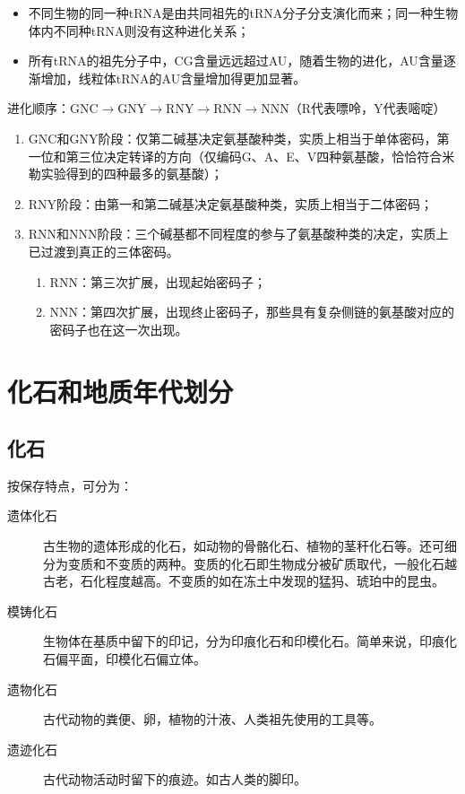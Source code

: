 \begin{itemize}
	\item 不同生物的同一种tRNA是由共同祖先的tRNA分子分支演化而来；同一种生物体内不同种tRNA则没有这种进化关系；
	\item 所有tRNA的祖先分子中，CG含量远远超过AU，随着生物的进化，AU含量逐渐增加，线粒体tRNA的AU含量增加得更加显著。
\end{itemize}

进化顺序：GNC$\longrightarrow$GNY$\longrightarrow$RNY$\longrightarrow$RNN$\longrightarrow$NNN（R代表嘌呤，Y代表嘧啶）

\begin{enumerate}
	\item GNC和GNY阶段：仅第二碱基决定氨基酸种类，实质上相当于单体密码，第一位和第三位决定转译的方向（仅编码G、A、E、V四种氨基酸，恰恰符合米勒实验得到的四种最多的氨基酸）；
	\item RNY阶段：由第一和第二碱基决定氨基酸种类，实质上相当于二体密码；
	\item RNN和NNN阶段：三个碱基都不同程度的参与了氨基酸种类的决定，实质上已过渡到真正的三体密码。
	\begin{enumerate}
		\item RNN：第三次扩展，出现起始密码子；
		\item NNN：第四次扩展，出现终止密码子，那些具有复杂侧链的氨基酸对应的密码子也在这一次出现。
	\end{enumerate}
\end{enumerate}

\section{化石和地质年代划分}

\subsection{化石}

按保存特点，可分为：

\begin{description}
	\item[遗体化石] 古生物的遗体形成的化石，如动物的骨骼化石、植物的茎秆化石等。还可细分为变质和不变质的两种。变质的化石即生物成分被矿质取代，一般化石越古老，石化程度越高。不变质的如在冻土中发现的猛犸、琥珀中的昆虫。
	\item[模铸化石] 生物体在基质中留下的印记，分为印痕化石和印模化石。简单来说，印痕化石偏平面，印模化石偏立体。
	\item[遗物化石] 古代动物的粪便、卵，植物的汁液、人类祖先使用的工具等。
	\item[遗迹化石] 古代动物活动时留下的痕迹。如古人类的脚印。
\end{description}

